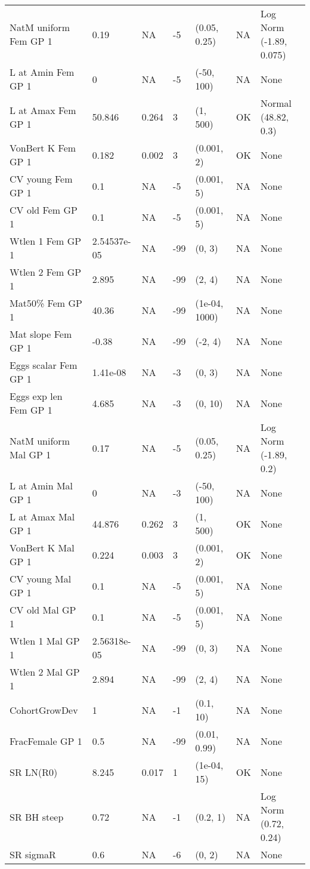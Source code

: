 \documentclass[11pt,
  english,
  letterpaper,
]{article}
\begin{document}
\begin{landscape}
\begin{longtable}[t]{>{\raggedright\arraybackslash}p{7.5cm}lllll>{\raggedright\arraybackslash}p{3.5cm}}
\endfoot
\bottomrule
\endlastfoot
NatM uniform Fem GP 1 & 0.19 & NA & -5 & (0.05, 0.25) & NA & Log Norm (-1.89, 0.075)\\
L at Amin Fem GP 1 & 0 & NA & -5 & (-50, 100) & NA & None\\
L at Amax Fem GP 1 & 50.846 & 0.264 & 3 & (1, 500) & OK & Normal (48.82, 0.3)\\
VonBert K Fem GP 1 & 0.182 & 0.002 & 3 & (0.001, 2) & OK & None\\
CV young Fem GP 1 & 0.1 & NA & -5 & (0.001, 5) & NA & None\\
CV old Fem GP 1 & 0.1 & NA & -5 & (0.001, 5) & NA & None\\
Wtlen 1 Fem GP 1 & 2.54537e-05 & NA & -99 & (0, 3) & NA & None\\
Wtlen 2 Fem GP 1 & 2.895 & NA & -99 & (2, 4) & NA & None\\
Mat50\% Fem GP 1 & 40.36 & NA & -99 & (1e-04, 1000) & NA & None\\
Mat slope Fem GP 1 & -0.38 & NA & -99 & (-2, 4) & NA & None\\
Eggs scalar Fem GP 1 & 1.41e-08 & NA & -3 & (0, 3) & NA & None\\
Eggs exp len Fem GP 1 & 4.685 & NA & -3 & (0, 10) & NA & None\\
NatM uniform Mal GP 1 & 0.17 & NA & -5 & (0.05, 0.25) & NA & Log Norm (-1.89, 0.2)\\
L at Amin Mal GP 1 & 0 & NA & -3 & (-50, 100) & NA & None\\
L at Amax Mal GP 1 & 44.876 & 0.262 & 3 & (1, 500) & OK & None\\
VonBert K Mal GP 1 & 0.224 & 0.003 & 3 & (0.001, 2) & OK & None\\
CV young Mal GP 1 & 0.1 & NA & -5 & (0.001, 5) & NA & None\\
CV old Mal GP 1 & 0.1 & NA & -5 & (0.001, 5) & NA & None\\
Wtlen 1 Mal GP 1 & 2.56318e-05 & NA & -99 & (0, 3) & NA & None\\
Wtlen 2 Mal GP 1 & 2.894 & NA & -99 & (2, 4) & NA & None\\
CohortGrowDev & 1 & NA & -1 & (0.1, 10) & NA & None\\
FracFemale GP 1 & 0.5 & NA & -99 & (0.01, 0.99) & NA & None\\
SR LN(R0) & 8.245 & 0.017 & 1 & (1e-04, 15) & OK & None\\
SR BH steep & 0.72 & NA & -1 & (0.2, 1) & NA & Log Norm (0.72, 0.24)\\
SR sigmaR & 0.6 & NA & -6 & (0, 2) & NA & None\\

\end{longtable}
\end{landscape}
\end{document}
